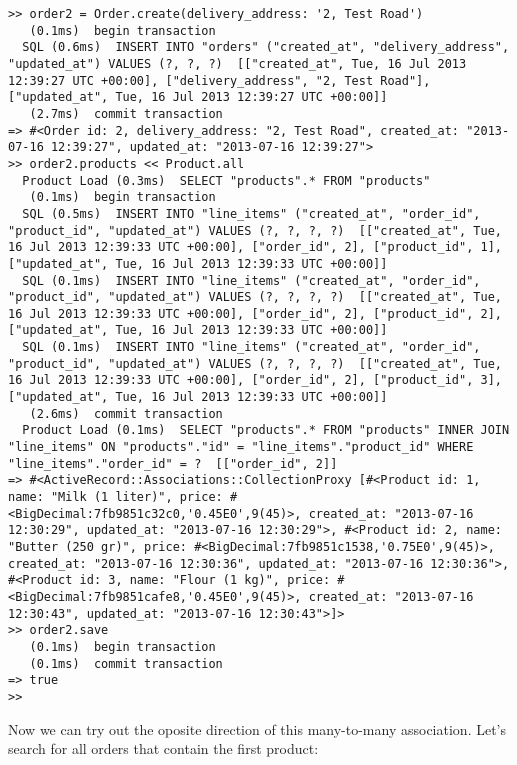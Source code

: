 \documentclass[a4paper]{book}
\begin{document}
\begin{shaded}\begin{verbatim}
>> order2 = Order.create(delivery_address: '2, Test Road')
   (0.1ms)  begin transaction
  SQL (0.6ms)  INSERT INTO "orders" ("created_at", "delivery_address", "updated_at") VALUES (?, ?, ?)  [["created_at", Tue, 16 Jul 2013 12:39:27 UTC +00:00], ["delivery_address", "2, Test Road"], ["updated_at", Tue, 16 Jul 2013 12:39:27 UTC +00:00]]
   (2.7ms)  commit transaction
=> #<Order id: 2, delivery_address: "2, Test Road", created_at: "2013-07-16 12:39:27", updated_at: "2013-07-16 12:39:27">
>> order2.products << Product.all
  Product Load (0.3ms)  SELECT "products".* FROM "products"
   (0.1ms)  begin transaction
  SQL (0.5ms)  INSERT INTO "line_items" ("created_at", "order_id", "product_id", "updated_at") VALUES (?, ?, ?, ?)  [["created_at", Tue, 16 Jul 2013 12:39:33 UTC +00:00], ["order_id", 2], ["product_id", 1], ["updated_at", Tue, 16 Jul 2013 12:39:33 UTC +00:00]]
  SQL (0.1ms)  INSERT INTO "line_items" ("created_at", "order_id", "product_id", "updated_at") VALUES (?, ?, ?, ?)  [["created_at", Tue, 16 Jul 2013 12:39:33 UTC +00:00], ["order_id", 2], ["product_id", 2], ["updated_at", Tue, 16 Jul 2013 12:39:33 UTC +00:00]]
  SQL (0.1ms)  INSERT INTO "line_items" ("created_at", "order_id", "product_id", "updated_at") VALUES (?, ?, ?, ?)  [["created_at", Tue, 16 Jul 2013 12:39:33 UTC +00:00], ["order_id", 2], ["product_id", 3], ["updated_at", Tue, 16 Jul 2013 12:39:33 UTC +00:00]]
   (2.6ms)  commit transaction
  Product Load (0.1ms)  SELECT "products".* FROM "products" INNER JOIN "line_items" ON "products"."id" = "line_items"."product_id" WHERE "line_items"."order_id" = ?  [["order_id", 2]]
=> #<ActiveRecord::Associations::CollectionProxy [#<Product id: 1, name: "Milk (1 liter)", price: #<BigDecimal:7fb9851c32c0,'0.45E0',9(45)>, created_at: "2013-07-16 12:30:29", updated_at: "2013-07-16 12:30:29">, #<Product id: 2, name: "Butter (250 gr)", price: #<BigDecimal:7fb9851c1538,'0.75E0',9(45)>, created_at: "2013-07-16 12:30:36", updated_at: "2013-07-16 12:30:36">, #<Product id: 3, name: "Flour (1 kg)", price: #<BigDecimal:7fb9851cafe8,'0.45E0',9(45)>, created_at: "2013-07-16 12:30:43", updated_at: "2013-07-16 12:30:43">]>
>> order2.save
   (0.1ms)  begin transaction
   (0.1ms)  commit transaction
=> true
>>
\end{verbatim}\end{shaded}

Now we can try out the oposite direction of this many-to-many association. Let's search for all orders that contain the first product:
\end{document}
